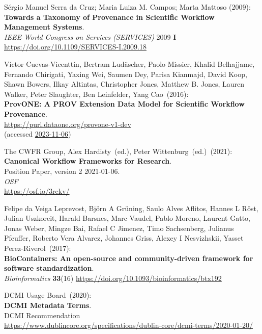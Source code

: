 \begin{thebibliography}{9}
Sérgio Manuel Serra da Cruz; Maria Luiza M. Campos; Marta Mattoso (2009):\\
\textbf{Towards a Taxonomy of Provenance in Scientific Workflow Management Systems}.\\
\emph{IEEE World Congress on Services (SERVICES)} 2009 \textbf{I}\\
\url{https://doi.org/10.1109/SERVICES-I.2009.18}

Víctor Cuevas-Vicenttín, Bertram Ludäscher, Paolo Missier, Khalid Belhajjame, Fernando Chirigati, Yaxing Wei, Saumen Dey, Parisa Kianmajd, David Koop, Shawn Bowers, Ilkay Altintas, Christopher Jones, Matthew B. Jones, Lauren Walker, Peter Slaughter, Ben Leinfelder, Yang Cao~(2016): \\
\textbf{ProvONE: A PROV Extension Data Model for Scientific Workflow Provenance}.\\
\url{https://purl.dataone.org/provone-v1-dev}\\
(accessed \href{https://web.archive.org/web/20231106005203/http://jenkins-1.dataone.org/jenkins/view/Documentation%20Projects/job/ProvONE-Documentation-trunk/ws/provenance/ProvONE/v1/provone.html}{2023-11-06})

The CWFR Group, Alex Hardisty~(ed.), Peter Wittenburg~(ed.)~(2021): \\
\textbf{Canonical Workflow Frameworks for Research}.\\
Position Paper, version 2 2021-01-06. \\
\emph{OSF} \\
\url{https://osf.io/3rekv/}

Felipe da Veiga Leprevost, Björn A Grüning, Saulo Alves Aflitos, Hannes L Röst, Julian Uszkoreit, Harald Barsnes, Marc Vaudel, Pablo Moreno, Laurent Gatto, Jonas Weber, Mingze Bai, Rafael C Jimenez, Timo Sachsenberg, Julianus Pfeuffer, Roberto Vera Alvarez, Johannes Griss, Alexey I Nesvizhskii, Yasset Perez-Riverol~(2017): \\
\textbf{BioContainers: An open-source and community-driven framework for software standardization}.\\
\emph{Bioinformatics} \textbf{33}(16) 
\url{https://doi.org/10.1093/bioinformatics/btx192}

DCMI Usage Board~(2020): \\
\textbf{DCMI Metadata Terms}. \\
DCMI Recommendation\\
\url{https://www.dublincore.org/specifications/dublin-core/dcmi-terms/2020-01-20/}


\end{thebibliography}
